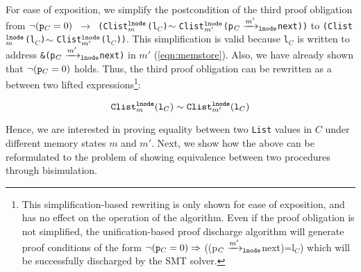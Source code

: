 For ease of exposition, we simplify the postcondition of the third proof obligation
from
{\small \tt $\neg({\tt p}_C=0)$ $\rightarrow$ (Clist$_{m}^{{\tt lnode}}$(l$_C$)$\sim{}$Clist$_{m'}^{{\tt lnode}}$(p$_C\xrightarrow[]{m'}_{\mathrm{\tt lnode}}$next))}
to
{\tt (Clist$_{m}^{{\tt lnode}}$(l$_C$)$\sim{}$Clist$_{m'}^{{\tt lnode}}$(l$_C$))}.
This simplification is valid because {\tt l$_C$}
is written
to address {\tt \&(p$_C\xrightarrow[]{m'}_{\mathrm{\tt lnode}}$next)}
in $m'$ (\cref{eqn:memstore}).
Also, we have already
shown that $\neg({\tt p}_C=0)$ holds.
Thus, the third proof obligation can be rewritten as
a \recursiveRelation{} between two lifted expressions\footnote{This
simplification-based rewriting is only
shown for ease of exposition,
and has no effect on the operation
of the algorithm.
Even if the proof obligation is not simplified,
the unification-based proof discharge algorithm will generate
proof conditions of the form $\neg({\tt p}_C=0)\Rightarrow{}$((p$_C\xrightarrow[]{m'}_{\mathrm{\tt lnode}}$next)=l$_C$)
which will be successfully discharged by the SMT solver.}:
\begin{small}
\begin{equation}\label{eqn:clistPreserved}
{\tt Clist}_m^{\tt lnode}({\tt l}_C) \sim{} {\tt Clist}_{m'}^{\tt lnode}({{\tt l}_C})
\end{equation}
\end{small}

Hence, we are interested in proving equality
between two {\tt List} values in $C$ under different memory states $m$ and $m'$.
Next, we show how the above can be reformulated to the problem of
showing equivalence between two procedures through bisimulation.



